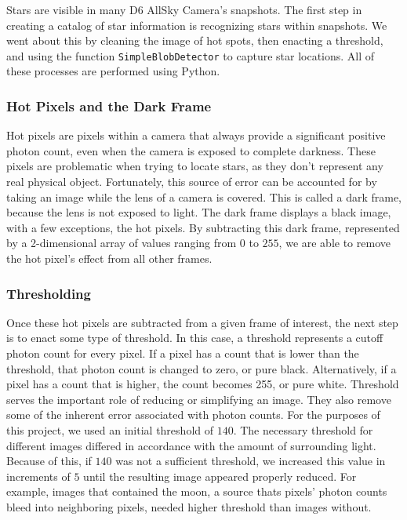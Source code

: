 Stars are visible in many D6 AllSky Camera's snapshots.  
The first step in creating a catalog of star information is recognizing stars within snapshots.  
We went about this by cleaning the image of hot spots, then enacting a threshold, and using the function \texttt{SimpleBlobDetector} to capture star locations.
All of these processes are performed using Python.

\subsubsection{Hot Pixels and the Dark Frame}

Hot pixels are pixels within a camera that always provide a significant positive photon count, even when the camera is exposed to complete darkness.
These pixels are problematic when trying to locate stars, as they don't represent any real physical object.
Fortunately, this source of error can be accounted for by taking an image while the lens of a camera is covered.  
This is called a dark frame, because the lens is not exposed to light.
The dark frame displays a black image, with a few exceptions, the hot pixels.
By subtracting this dark frame, represented by a 2-dimensional array of values ranging from $0$ to $255$, we are able to remove the hot pixel's effect from all other frames.

\subsubsection{Thresholding}

Once these hot pixels are subtracted from a given frame of interest, the next step is to enact some type of threshold.
In this case, a threshold represents a cutoff photon count for every pixel.  
If a pixel has a count that is lower than the threshold, that photon count is changed to zero, or pure black.  
Alternatively, if a pixel has a count that is higher, the  count becomes 255, or pure white.  
Threshold serves the important role of reducing or simplifying an image.
They also remove some of the inherent error associated with photon counts.
For the purposes of this project, we used an initial threshold of $140$.
The necessary threshold for different images differed in accordance with the amount of surrounding light.
Because of this, if $140$ was not a sufficient threshold, we increased this value in increments of $5$ until the resulting image appeared properly reduced. 
For example, images that contained the moon, a source thats pixels' photon counts bleed into neighboring pixels, needed higher threshold than images without.

